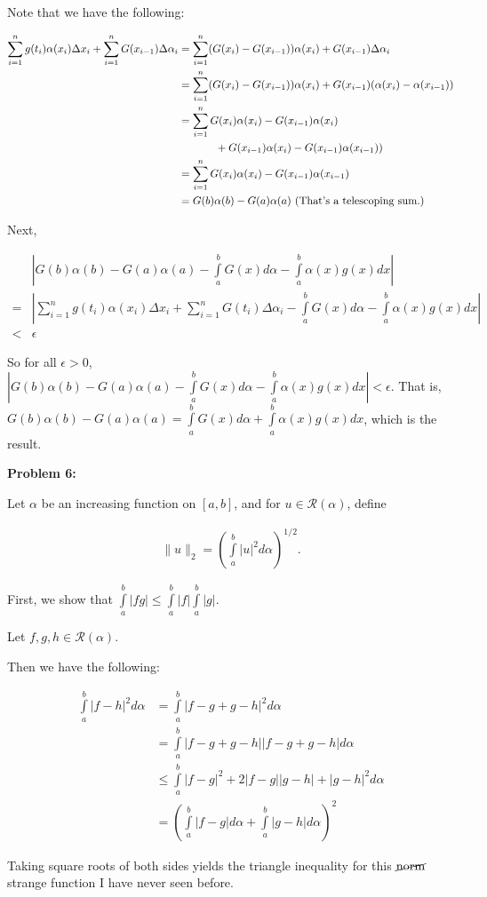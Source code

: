 \documentclass[a4paper,12pt]{article}
\newcommand{\tab}{\hspace{4mm}} %
\newcommand{\shunt}{\vspace{20mm}}
\newcommand{\absval}[1]{\left\lvert #1 \right\rvert}
\newcommand{\norm}[1]{\|#1\|}
\newcommand{\al}{\alpha} %
\newcommand{\De}{\Delta}
\newcommand{\ep}{\epsilon}
\newcommand{\scrR}{\mathcal{R}}
\begin{document}
Note that we have the following:

\begin{align*}
\sum\limits_{i=1}^n g(t_i)\al(x_i) \Delta x_i + \sum\limits_{i=1}^n G(x_{i-1})\Delta \al_i &= \sum\limits_{i=1}^n (G(x_i)-G(x_{i-1})) \al(x_i) + G(x_{i-1}) \De \al_i \\
&= \sum\limits_{i=1}^n (G(x_i)-G(x_{i-1}))\al(x_i) + G(x_{i-1})(\al(x_i)-\al(x_{i-1})) \\
&= \sum\limits_{i=1}^n G(x_i)\al(x_i)-G(x_{i-1})\al(x_i) \\
& \tab \tab \tab + G(x_{i-1})\al(x_i)-G(x_{i-1})\al(x_{i-1})) \\
&= \sum\limits_{i=1}^n G(x_i)\al(x_i)-G(x_{i-1})\al(x_{i-1}) \\
&= G(b)\al(b) - G(a)\al(a) \text{ (That's a telescoping sum.)}
\end{align*}

Next,

\begin{align*}
&\absval{G(b)\al(b)-G(a)\al(a)- \int\limits_a^b G(x)d\al - \int\limits_a^b \al(x)g(x)dx} \\
=& \absval{\sum\limits_{i=1}^n g(t_i)\al(x_i) \Delta x_i + \sum\limits_{i=1}^n G(t_i)\Delta \al_i - \int\limits_a^b G(x)d\al - \int\limits_a^b \al(x)g(x)dx} \\
<& \ep
\end{align*}

So for all $\ep >0$, $\absval{G(b)\al(b)-G(a)\al(a)- \int\limits_a^b G(x)d\al - \int\limits_a^b \al(x)g(x)dx} < \ep$. That is, $G(b)\al(b)-G(a)\al(a) =  \int\limits_a^b G(x)d\al + \int\limits_a^b \al(x)g(x)dx$, which is the result.

\shunt

{\bf Problem 6:}

Let $\al$ be an increasing function on $[a,b]$, and for $u \in \scrR (\al)$, define

\begin{align*}
\norm{u}_2 = \left(\int\limits_a^b \absval{u}^2 d\al \right)^{1/2}.
\end{align*}

First, we show that $\int\limits_a^b \absval{fg} \leq \int\limits_a^b \absval{f} \int\limits_a^b \absval{g}$.

\tab %

Let $f,g,h \in \scrR(\al)$.

Then we have the following:

\begin{align*}
\int\limits_a^b \absval{f-h}^2 d\al &= \int\limits_a^b \absval{f-g+g-h}^2 d\al \\
&= \int\limits_a^b \absval{f-g+g-h}\absval{f-g+g-h} d\al \\
&\leq \int\limits_a^b \absval{f-g}^2 +2\absval{f-g}\absval{g-h} + \absval{g-h}^2 d\al \\
&= \left(\int\limits_a^b \absval{f-g} d\al + \int\limits_a^b \absval{g-h} d\al\right)^2
\end{align*}

Taking square roots of both sides yields the triangle inequality for this $\cancel{\text{norm}}$ strange function I have never seen before.

\shunt
\end{document}
